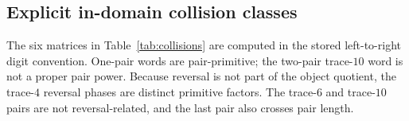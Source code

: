 \begin{table}[t]
\centering
\caption{Projection-by-projection truth matrix.  ``Integer'' means
rational-integer-valued support, while ``prime'' includes full rational-prime
coverage/selectivity.  The norm row prevents the stronger but false claim
that every projection fails clock or powers.}
\label{tab:projection-truth}
\end{table}

\subsection{Explicit in-domain collision classes}

The six matrices in Table~\ref{tab:collisions} are computed in the stored
left-to-right digit convention.  One-pair words are pair-primitive; the
two-pair trace-$10$ word is not a proper pair power.  Because reversal is not
part of the object quotient, the trace-$4$ reversal phases are distinct
primitive factors.  The trace-$6$ and trace-$10$ pairs are not
reversal-related, and the last pair also crosses pair length.

